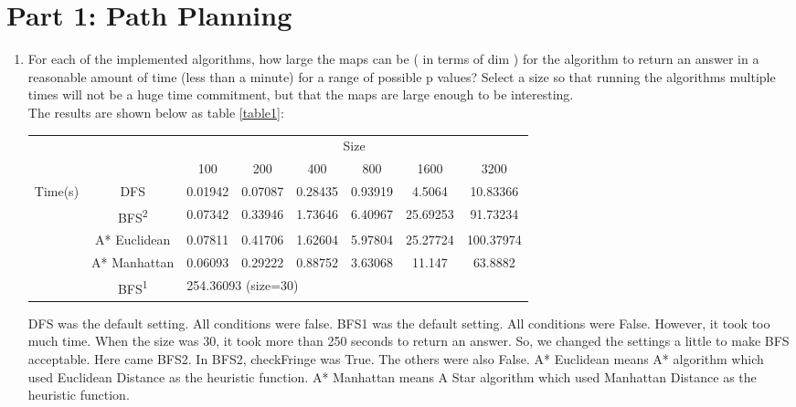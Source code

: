 \documentclass[letter]{article}
\begin{document}
\section{Part 1: Path Planning}
\label{sec:Part 1: Path Planning}

\begin{enumerate}
	\item {For each of the implemented algorithms, how large the maps can be ( in terms of dim ) for the algorithm to return an answer in a reasonable amount of time (less than a minute) for a range of possible p values? Select a size so that running the algorithms multiple times will not be a huge time commitment, but that the maps are large enough to be interesting.} \\
	The results are shown below as table \ref{table1}: \\
	\begin{center}
		\label{table1}
		\begin{tabular}[h]{| c | c | c | c | c | c | c | c |}
			\hline
			\multicolumn{2}{|c|}{} & \multicolumn{6}{c|}{Size} \\
			\cline{3-8}
			\multicolumn{2}{|c|}{} & 100 & 200 & 400 & 800 & 1600 & 3200 \\
			\hline
			\multirow{5}{*}{Time(s)} & DFS & 0.01942 & 0.07087 & 0.28435 & 0.93919 & 4.5064 & 10.83366 \\
			\cline{2-8}
			 & BFS\textsuperscript{2} & 0.07342 & 0.33946 & 1.73646 & 6.40967 & 25.69253 & 91.73234 \\
			 \cline{2-8}
			 & A* Euclidean & 0.07811 & 0.41706 & 1.62604 & 5.97804 & 25.27724 & 100.37974 \\
			 \cline{2-8}
			 & A* Manhattan & 0.06093 & 0.29222 & 0.88752 & 3.63068 & 11.147 & 63.8882 \\
			 \cline{2-8}
			 & BFS\textsuperscript{1} & \multicolumn{6}{l|}{254.36093 (size=30)} \\
			 \hline
		\end{tabular}
	\end{center}
	DFS was the default setting. All conditions were false. BFS1 was the default setting. All conditions were False. However, it took too much time. When the size was 30, it took more than 250 seconds to return an answer. So, we changed the settings a little to make BFS acceptable. Here came BFS2. In BFS2, checkFringe was True. The others were also False. A* Euclidean means A* algorithm which used Euclidean Distance as the heuristic function. A* Manhattan means A Star algorithm which used Manhattan Distance as the heuristic function.
	

\end{enumerate}
\end{document}
